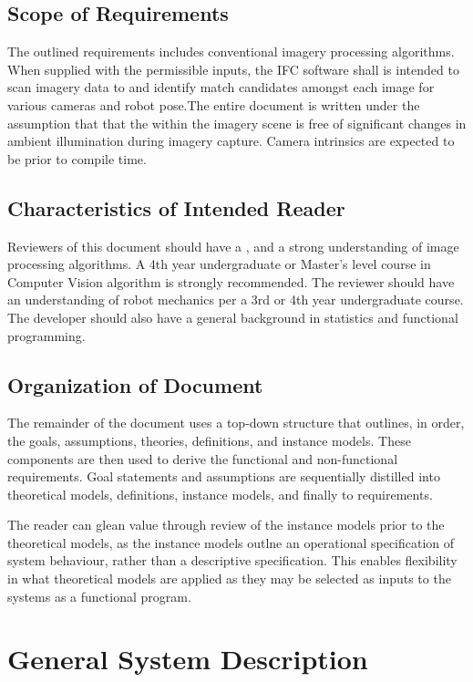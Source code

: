 \documentclass[12pt]{article}
\begin{document}
\subsection{Scope of Requirements} 
The outlined requirements includes conventional imagery processing algorithms. When supplied 
with the permissible inputs, the IFC software shall is intended to scan imagery data to and 
identify match candidates amongst each image for various cameras and robot pose.The entire 
document is written under the assumption that that the within the imagery scene 
is free of significant changes in ambient illumination during imagery capture. Camera 
intrinsics are expected to be prior to compile time.

\subsection{Characteristics of Intended Reader} \label{sec_IntendedReader}
Reviewers of this document should have a , 
and a strong understanding of image processing algorithms. A 4th year undergraduate or 
Master's level course in Computer Vision algorithm is strongly recommended. The 
reviewer should have an understanding of robot mechanics per a 3rd or 4th year 
undergraduate course. The developer should also have a general background in statistics 
and functional programming.

\subsection{Organization of Document}
The remainder of the document uses a top-down structure that outlines, in order, 
the goals, assumptions, theories, definitions, and instance models. These 
components are then used to derive the functional and non-functional requirements. 
Goal statements and assumptions are sequentially distilled into theoretical models, 
definitions, instance models, and finally to requirements.

The reader can glean value through review of the instance models prior to 
the theoretical models, as the instance models outlne an operational specification of 
system behaviour, rather than a descriptive specification. This enables flexibility 
in what theoretical models are applied as they may be selected as inputs to the 
systems as a functional program. 

\section{General System Description}
\end{document}
